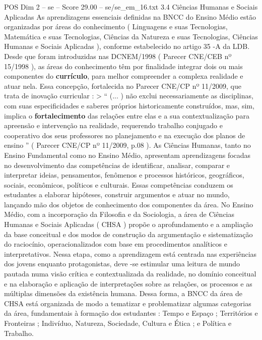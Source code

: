\begin{textsample}{POS Dim 2 – se – Score 29.00 – se/se\_em\_16.txt}  \label{ex:f2_pos_024}
3.4 Ciências Humanas e Sociais Aplicadas As aprendizagens essenciais definidas na BNCC do Ensino Médio estão organizadas por áreas do conhecimento ( Linguagens e suas Tecnologias, Matemática e suas Tecnologias, Ciências da Natureza e suas Tecnologias, Ciências Humanas e Sociais Aplicadas ), conforme estabelecido no artigo 35 -A da LDB.
Desde que foram introduzidas nas DCNEM/1998 ( Parecer CNE/CEB nº 15/1998 ), as áreas do conhecimento têm por finalidade integrar dois ou mais componentes do \textbf{currículo}, para melhor compreender a complexa realidade e atuar nela.
Essa concepção, fortalecida no Parecer CNE/CP nº 11/2009, que trata de inovação curricular : > “ (... ) não exclui necessariamente as disciplinas, com suas especificidades e saberes próprios historicamente construídos, mas, sim, implica o \textbf{fortalecimento} das relações entre elas e a sua contextualização para apreensão e intervenção na realidade, requerendo trabalho conjugado e cooperativo dos seus professores no planejamento e na execução dos planos de ensino ” ( Parecer CNE/CP nº 11/2009, p.08 ).
As Ciências Humanas, tanto no Ensino Fundamental como no Ensino Médio, apresentam aprendizagens focadas no desenvolvimento das competências de identificar, analisar, comparar e interpretar ideias, pensamentos, fenômenos e processos históricos, geográficos, sociais, econômicos, políticos e culturais.
Essas competências conduzem os estudantes a elaborar hipóteses, construir argumentos e atuar no mundo, lançando mão dos objetos de conhecimento dos componentes da área.
No Ensino Médio, com a incorporação da Filosofia e da Sociologia, a área de Ciências Humanas e Sociais Aplicadas ( CHSA ) propõe o aprofundamento e a ampliação da base conceitual e dos modos de construção da argumentação e sistematização do raciocínio, operacionalizados com base em procedimentos analíticos e interpretativos.
Nessa etapa, como a aprendizagem está centrada nas experiências dos jovens enquanto protagonistas, deve -se estimular uma leitura de mundo pautada numa visão crítica e contextualizada da realidade, no domínio conceitual e na elaboração e aplicação de interpretações sobre as relações, os processos e as múltiplas dimensões da existência humana.
Dessa forma, a BNCC da área de CHSA está organizada de modo a tematizar e problematizar algumas categorias da área, fundamentais à formação dos estudantes : Tempo e Espaço ; Territórios e Fronteiras ; Indivíduo, Natureza, Sociedade, Cultura e Ética ; e Política e Trabalho.

\end{textsample}
